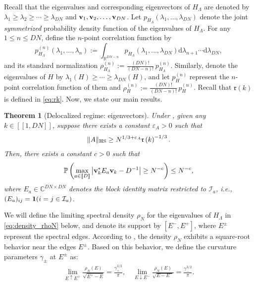 \documentclass[10pt,reqno]{amsart}
\numberwithin{equation}{section}
\numberwithin{figure}{section}
\theoremstyle{plain} %
\newtheorem{theorem}{Theorem}[section]
\theoremstyle{definition} %
\newcommand{\VV}{H_{\Lambda}}
\newcommand{\cal}{\mathcal}
\renewcommand{\txt}[1]{\text{\rm{#1}}}
\newcommand{\R}{\mathbb{R}}
\newcommand{\C}{\mathbb{C}}
\newcommand{\fr}{{\mathfrak{r}}}
\renewcommand{\geq}{\ge}
\newcommand{\qq}[1]{[\![{#1}]\!]}
\newcommand{\pa}[1]{\left({#1}\right)}
\newcommand{\HS}{\txt{HS}}
\numberwithin{equation}{section}
\begin{document}
Recall that the eigenvalues and corresponding eigenvectors of $H_{\Lambda}$ are denoted by $\lambda_1\geq \lambda_2\geq \cdots \geq \lambda_{DN}$ and ${\bf v}_1,\mathbf{v}_2,\ldots, {\bf v}_{DN}$. Let $p_{H_{\Lambda}}(\lambda_1,\ldots, \lambda_{DN})$ denote the joint \emph{symmetrized} probability density function of the eigenvalues of $H_{\Lambda}$. For any $1\le n \le DN$, define the $n$-point correlation function by
$$
p_{H_{\Lambda}}^{(n)}\left(\lambda_1, \ldots, \lambda_n\right)
:=\int_{\R^{DN-n}} p_{H_{\Lambda}}\left(\lambda_1, \ldots, \lambda_{DN}\right) \mathrm{d} \lambda_{n+1} \cdots \mathrm{d} \lambda_{DN},
$$
and its standard normalization $\rho_{H_{\Lambda}}^{(n)}:=\frac{(DN)!}{(DN-n)!}\,p_{H_{\Lambda}}^{(n)}$.
Similarly, denote the eigenvalues of $H$ by $\lambda_1(H)\ge \cdots \ge \lambda_{DN}(H)$, and %
let $p_H^{(n)} $ represent the $n$-point correlation function of them and $\rho_H^{(n)}:=\frac{(DN)!}{(DN-n)!}\,p_H^{(n)}$.
Recall that $\mathfrak{r}\pa{k}$ is defined in \eqref{eq:rk}. %
Now, we state our main results.



\begin{theorem}[Delocalized regime: eigenvectors]\label{mix} 
Under , given any $k\in\qq{1,DN}$, suppose there exists a constant $\varepsilon_A>0$ such that
\begin{equation}\label{eq:condA1}
\|A\|_{\HS}\ge N^{1/3+\varepsilon_A}\fr\pa{k}^{-1/3} .
\end{equation}
Then, there exists a constant $c>0$ such that 
\begin{equation}\label{eq:main_evector1}
\mathbb P\left( \max_{a\in\llbracket D\rrbracket}\left|{\bf v}_k^* E_{a}  {\bf v}_k-D^{-1}\right|\ge N^{-c}\right)\le N^{-c},
\end{equation}
where $E_a\in \C^{DN\times DN}$ denotes the block identity matrix restricted to $\cal I_a$, i.e., $(E_{a})_{ij}={\bf 1}(i=j\in {\cal I}_a)$.
\end{theorem}


We will define the limiting spectral density $\rho_N$ for the eigenvalues of $\VV$ in \eqref{eq:density_rhoN} below, and denote its support by $[E^-,E^+]$, where $E^\pm$ represent the spectral edges.
According to \cite[Lemma 4.3]{lee2015edge},
the density $\rho_N$ exhibits a square-root behavior near the edges $E^\pm$. Based on this behavior, we define the curvature parameters $\gamma_{\pm}$ at $E^\pm$ as:
\begin{equation}\label{eq:def_gamma}
    \begin{aligned}
        \lim_{E\uparrow E^+} \frac{\rho_N(E)}{\sqrt{E^+-E}}=\frac{\gamma_+^{3/2}}{\pi}, \quad \lim_{E\downarrow E^-} \frac{\rho_N(E)}{\sqrt{E-E^-}}=\frac{\gamma_-^{3/2}}{\pi}.
    \end{aligned}
\end{equation}
\end{document}
